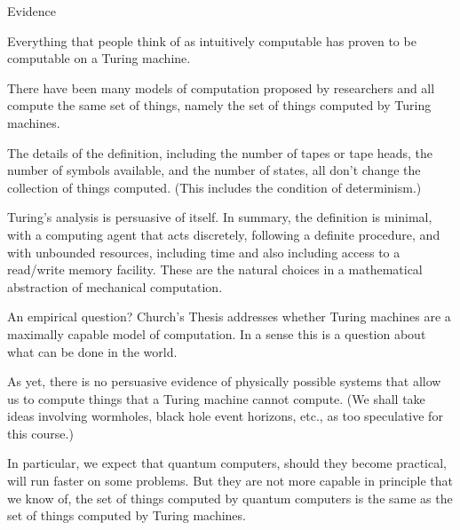 \documentclass[9pt,t,serif,professionalfont,xcolor={table,dvipsnames},noamsthm]{beamer}
\begin{document}
\begin{frame}{Evidence}
\begin{description}[xxx]  %
\item[Coverage]
Everything that people think of as intuitively computable has proven to
be computable on a Turing machine.
\pause\item[Convergence]
There have been many models of computation proposed by researchers and all 
compute the same set of things, namely the set of things computed by
Turing machines.
\pause\item[Consistency]
The details of the definition, including the number of tapes or tape
heads, the number of symbols available, and the number of states, all
don't change the collection of things computed.
(This includes the condition of determinism.)
\pause\item[Clarity]
Turing's analysis is persuasive of itself.
In summary, the definition is minimal,
with a computing agent that acts discretely, following a definite procedure,
and with unbounded resources, including time and also including access
to a read/write memory facility.
These are the natural choices in a mathematical abstraction of
mechanical computation. 
\end{description}
\end{frame}

\begin{frame}{An empirical question?}
Church's Thesis addresses whether Turing machines are a maximally capable
model of computation.
In a sense this is a question about
what can be done in the world.
  
As yet, there is no persuasive evidence of physically possible
systems that allow us to compute things that a Turing machine
cannot compute.
(We shall take ideas involving wormholes, black hole event horizons,
etc., 
as too speculative for this course.)

In particular, we expect that quantum computers, should they become practical,
will run faster on some problems. 
But they are not more capable in principle\Dash
that we know of, the set of things computed by 
quantum computers is the same as the set of things computed by 
Turing machines.
\end{frame}
\end{document}

